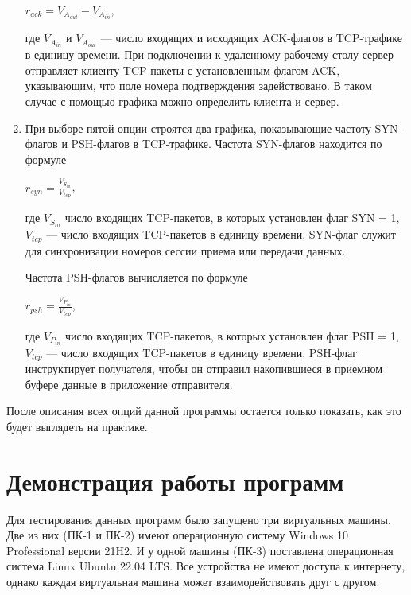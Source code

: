 \documentclass[bachelor, och, coursework]{SCWorks}
\begin{document}
\begin{enumerate}
    \begin{center}
      $r_{ack} = V_{A_{out}} - V_{A_{in}}$,
    \end{center}

    где $V_{A_{in}}$ и $V_{A_{out}}$ --- число входящих и исходящих ACK-флагов в TCP-трафике в единицу времени. При подключении к удаленному рабочему 
    столу сервер отправляет клиенту TCP-пакеты с установленным флагом ACK, указывающим, что поле номера подтверждения задействовано. В таком случае с
    помощью графика можно определить клиента и сервер.
    \item При выборе пятой опции строятся два графика, показывающие частоту SYN-флагов и PSH-флагов в TCP-трафике. Частота SYN-флагов находится по формуле
    
    \begin{center}
      $r_{syn} = \frac{V_{S_{in}}}{V_{tcp}}$,
    \end{center}

    где $V_{S_{in}}$ число входящих TCP-пакетов, в которых установлен флаг SYN = 1, $V_{tcp}$ --- число входящих TCP-пакетов в единицу времени.
    SYN-флаг служит для синхронизации номеров сессии приема или передачи данных.

    Частота PSH-флагов вычисляется по формуле 
    
    \begin{center}
      $r_{psh} = \frac{V_{P_{in}}}{V_{tcp}}$,
    \end{center}
    
    где $V_{P_{in}}$ число входящих TCP-пакетов, в которых установлен флаг PSH = 1, $V_{tcp}$ --- число входящих TCP-пакетов в единицу времени.
    PSH-флаг инструктирует получателя, чтобы он отправил накопившиеся в приемном буфере данные в приложение отправителя.
  \end{enumerate}

  После описания всех опций данной программы остается только показать, как это будет выглядеть на практике.

  \section{Демонстрация работы программ}

  Для тестирования данных программ было запущено три виртуальных машины. Две из них (ПК-1 и ПК-2) имеют операционную систему Windows 10 Professional версии 21H2.
  И у одной машины (ПК-3) поставлена операционная система Linux Ubuntu 22.04 LTS. Все устройства не имеют доступа к интернету, однако каждая виртуальная машина 
  может взаимодействовать друг с другом.
\end{document}
